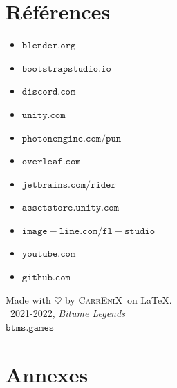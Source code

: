 \documentclass[12pt,a4paper]{article}
\newcommand{\btmlgs}{\textsl{Bitume Legends}}
\newcommand{\CEX}{\textsc{CarrEniX}}
\newcommand{\SITE}{\(\mathtt{btms.games}\)}
\begin{document}
    \section*{Références}
        \begin{itemize}
            \item \(\mathtt{blender.org}\)
            \item \(\mathtt{bootstrapstudio.io}\)
            \item \(\mathtt{discord.com}\)
            \item \(\mathtt{unity.com}\)
            \item \(\mathtt{photonengine.com/pun}\)
            \item \(\mathtt{overleaf.com}\)
            \item \(\mathtt{jetbrains.com/rider}\)
            \item \(\mathtt{assetstore.unity.com}\)
            \item \(\mathtt{image-line.com/fl-studio}\)
            \item \(\mathtt{youtube.com}\)
            \item \(\mathtt{github.com}\) %
        \end{itemize}

        \begin{center}
            Made with $\heartsuit$ by \CEX\, on \LaTeX.\\
            \textcopyright\, 2021-2022, \btmlgs\\
            \SITE
        \end{center}

    \section*{Annexes}
    \listoffigures
\end{document}
